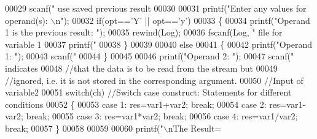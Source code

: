 \begin{DoxyCode}
00029         scanf(\textcolor{stringliteral}{" %
       use saved previous result}
00030       
00031         printf(\textcolor{stringliteral}{"Enter any values for operand(s): \(\backslash\)n"});
00032         \textcolor{keywordflow}{if}(opt==\textcolor{charliteral}{'Y'} || opt==\textcolor{charliteral}{'y'})
00033           \{
00034             printf(\textcolor{stringliteral}{"Operand 1 is the previous result: "});
00035             rewind(Log);
00036             fscanf(Log, \textcolor{stringliteral}{" %
       file for variable 1}
00037             printf(\textcolor{stringliteral}{"%
00038           \}  
00039       
00040         \textcolor{keywordflow}{else} 
00041         \{
00042           printf(\textcolor{stringliteral}{"Operand 1: "}); 
00043           scanf(\textcolor{stringliteral}{"%
00044         \}
00045         
00046         printf(\textcolor{stringliteral}{"Operand 2: "}); 
00047         scanf(\textcolor{stringliteral}{" %
       indicates }
00048                                                                 \textcolor{comment}{//that the data is to be read from the
       stream but }
00049                                                                 \textcolor{comment}{//ignored, i.e. it is not stored in the
       corresponding argument. }
00050                                                                 \textcolor{comment}{//Input of variable2}
00051         \textcolor{keywordflow}{switch}(ch)                                              \textcolor{comment}{//Switch case construct: Statements for
       different conditions}
00052         \{
00053           \textcolor{keywordflow}{case} 1: res=var1+var2; \textcolor{keywordflow}{break};
00054           \textcolor{keywordflow}{case} 2: res=var1-var2; \textcolor{keywordflow}{break};
00055           \textcolor{keywordflow}{case} 3: res=var1*var2; \textcolor{keywordflow}{break};
00056           \textcolor{keywordflow}{case} 4: res=var1/var2; \textcolor{keywordflow}{break};
00057         \}
00058          
00059         
00060         printf(\textcolor{stringliteral}{"\(\backslash\)nThe Result= %
}}}
\end{DoxyCode}
